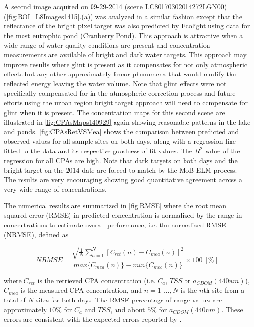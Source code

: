 
A second image acquired on 09-29-2014 (scene LC80170302014272LGN00) (\autoref{fig:ROI_L8Images1415}.(a)) was analyzed in a similar fashion except that the reflectance of the bright pixel target was also predicted by Ecolight using data for the most eutrophic pond (Cranberry Pond). This approach is attractive when a wide range of water quality conditions are present and concentration measurements are available of bright and dark water targets. This approach may improve results where glint is present as it compensates for not only atmospheric effects but any other approximately linear phenomena that would modify the reflected energy leaving the water volume. Note that glint effects were not specifically compensated for in the atmospheric correction process and future efforts using the urban region bright target approach will need to compensate for glint when it is present. The concentration maps for this second scene are illustrated in \autoref{fig:CPAsMaps140929} again showing reasonable patterns in the lake and ponds. \autoref{fig:CPAsRetVSMea} shows the comparison between predicted and observed values for all sample sites on both days, along with a regression line fitted to the data and its respective goodness of fit values. The $R^2$ value of the regression for all CPAs are high. Note that dark targets on both days and the bright target on the 2014 date are forced to match by the MoB-ELM process. The results are very encouraging showing good quantitative agreement across a very wide range of concentrations. 

The numerical results are summarized in \autoref{fig:RMSE} where the root mean squared error (RMSE) in predicted concentration is normalized by the range in concentrations to estimate overall performance, i.e. the normalized RMSE (NRMSE), defined as

\begin{equation}
\label{eq:error_percentage}
  NRMSE =\frac{\sqrt{\frac{1}{N}\sum_{n=1}^N{\left[C_{ret}(n) - C_{mea}(n)\right]^2}}}{max\{C_{mea}(n)\} - min\{C_{mea}(n)\}}\times100 ~[\%]
\end{equation}

\noindent where $C_{ret}$ is the retrieved CPA concentration (i.e. $C_a$, $TSS$ or $a_{CDOM}(440nm)$), $C_{mea}$ is the measured CPA concentration, and $n=1,...,N$ is the $n$th site from a total of $N$ sites for both days. The RMSE percentage of range values are approximately $10\%$ for $C_a$ and $TSS$, and about $5\%$ for $a_{CDOM}(440nm)$. These errors are consistent with the expected errors reported by \cite{Gerace:2013}. 


